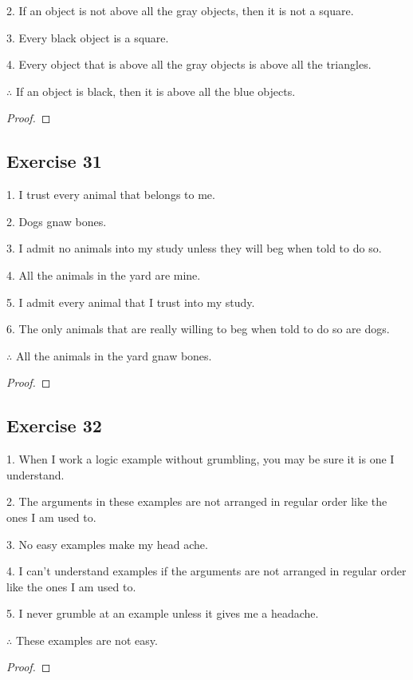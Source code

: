 \documentclass[14pt]{extarticle}
\begin{document}
2. If an object is not above all the gray objects, then it is not a square.

3. Every black object is a square.

4. Every object that is above all the gray objects is above all the triangles.

$\therefore$ If an object is black, then it is above all the
blue objects.

\begin{proof}

\end{proof}

\subsection{Exercise 31}
1. I trust every animal that belongs to me.

2. Dogs gnaw bones.

3. I admit no animals into my study unless they will beg when told to do so.

4. All the animals in the yard are mine.

5. I admit every animal that I trust into my study.

6. The only animals that are really willing to beg when told to do so are dogs.

$\therefore$ All the animals in the yard gnaw bones.

\begin{proof}

\end{proof}

\subsection{Exercise 32}
1. When I work a logic example without grumbling, you may be sure it is one I understand.

2. The arguments in these examples are not arranged in regular order like the ones I am used to.

3. No easy examples make my head ache.

4. I can’t understand examples if the arguments are not arranged in regular order like the ones I am used to.

5. I never grumble at an example unless it gives me a headache.

$\therefore$ These examples are not easy.

\begin{proof}

\end{proof}
\end{document}
